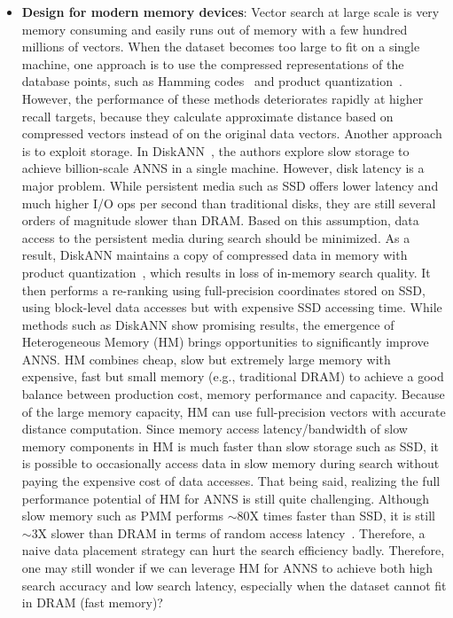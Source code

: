 \begin{itemize}
    \item \textbf{Design for modern memory devices}:  Vector search at large scale is very memory consuming and easily runs out of memory with a few hundred millions of vectors. When the dataset becomes too large to fit on a single machine, one approach is to use the compressed representations of the database points, such as Hamming codes~\cite{hamming-distance} and product quantization~\cite{link-and-code,opq,product-quantization,lopq,cartesian-kmeans}. However, the performance of these methods deteriorates rapidly at higher recall targets, because they calculate approximate distance based on compressed vectors instead of on the original data vectors. Another approach is to exploit storage. In DiskANN~\cite{diskann}, the authors explore slow storage to achieve billion-scale ANNS in a single machine. However, disk latency is a major problem. While persistent media such as SSD offers lower latency and much higher I/O ops per second than traditional disks, they are still several orders of magnitude slower than DRAM. Based on this assumption, data access to the persistent media during search should be minimized. As a result, DiskANN maintains a copy of compressed data in memory with product quantization~\cite{diskann}, which results in loss of in-memory search quality. It then performs a re-ranking using full-precision coordinates stored on SSD, using block-level data accesses but with expensive SSD accessing time. While methods such as DiskANN show promising results, the emergence of Heterogeneous Memory (HM) brings opportunities to significantly improve ANNS. HM combines cheap, slow but extremely large memory with expensive, fast but small memory (e.g., traditional DRAM) to achieve a good balance between production cost, memory performance and capacity. Because of the large memory capacity, HM can use full-precision vectors with accurate distance computation. Since memory access latency/bandwidth of slow memory components in HM is much faster than slow storage such as SSD, it is possible to occasionally access data in slow memory during search without paying the expensive cost of data accesses. That being said, realizing the full performance potential of HM for ANNS is still quite challenging. Although slow memory such as PMM performs $\sim$80X times faster than SSD, it is still $\sim$3X slower than DRAM in terms of random access latency~\cite{pmm-perf}. Therefore, a naive data placement strategy can hurt the search efficiency badly. Therefore, one may still wonder if we can leverage HM for ANNS to achieve both high search accuracy and low search latency, especially when the dataset cannot fit in DRAM (fast memory)?
\end{itemize}

